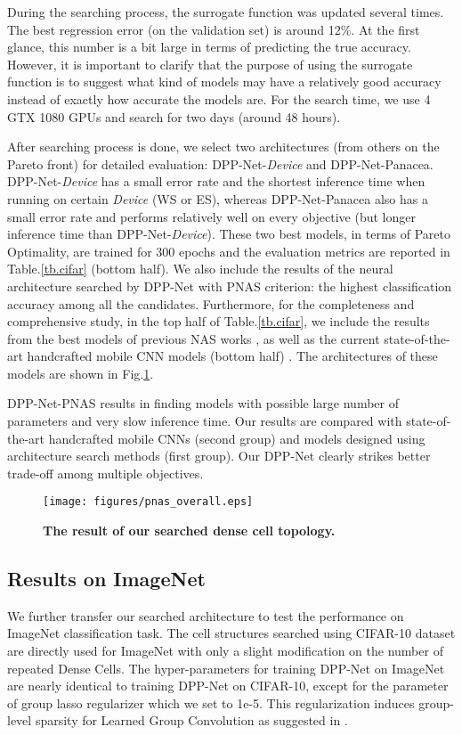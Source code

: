\documentclass[runningheads]{llncs}
\begin{document}
During the searching process, the surrogate function was updated several times. The best regression error (on the validation set) is around 12\%. At the first glance, this number is a bit large in terms of predicting the true accuracy. However, it is important to clarify that the purpose of using the surrogate function is to suggest what kind of models may have a relatively good accuracy instead of exactly how accurate the models are. For the search time, we use 4 GTX 1080 GPUs and search for two days (around 48 hours).

After searching process is done, we select two architectures (from others on the Pareto front) for detailed evaluation: DPP-Net-\textit{Device} and DPP-Net-Panacea. DPP-Net-\textit{Device} has a small error rate and the shortest inference time when running on certain \textit{Device} (WS or ES), whereas DPP-Net-Panacea also has a small error rate and performs relatively well on every objective (but longer inference time than DPP-Net-\textit{Device}). These two best models, in terms of Pareto Optimality, are trained for 300 epochs and the evaluation metrics are reported in Table.\ref{tb.cifar} (bottom half). We also include the results of the neural architecture searched by DPP-Net with PNAS \cite{liu2017progressive} criterion: the highest classification accuracy among all the candidates. Furthermore, for the completeness and comprehensive study, in the top half of Table.\ref{tb.cifar}, we include the results from the best models of previous NAS works \cite{zoph2017learning,real2017large,liu2017progressive}, as well as the current state-of-the-art handcrafted mobile CNN models (bottom half) \cite{huang2017condensenet,huang2017densely}. The architectures of these models are shown in Fig.\ref{fig.mobile_archis}.

DPP-Net-PNAS results in finding models with possible large number of parameters and very slow inference time. Our results are compared with state-of-the-art handcrafted mobile CNNs (second group) and models designed using architecture search methods (first group). Our DPP-Net clearly strikes better trade-off among multiple objectives.

\begin{figure}[h]
\begin{center}
\texttt{[image: figures/pnas\_overall.eps]}
\end{center}
\caption{\textbf{The result of our searched dense cell topology.}}
\label{fig.mobile_archis}
\end{figure}\subsection{Results on ImageNet}
We further transfer our searched architecture to test the performance on ImageNet classification task. The cell structures searched using CIFAR-10 dataset are directly used for ImageNet with only a slight modification on the number of repeated Dense Cells. The hyper-parameters for training DPP-Net on ImageNet are nearly identical to training DPP-Net on CIFAR-10, except for the parameter of group lasso regularizer which we set to 1e-5. This regularization induces group-level sparsity for Learned Group Convolution as suggested in \cite{huang2017condensenet}.
\end{document}
